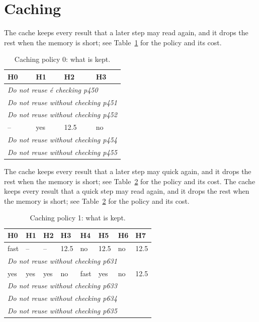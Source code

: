 \section{Caching}
The cache keeps every result that a later step may read again, and it drops the rest when the memory is short; see Table~\ref{tab:c0} for the policy and its cost. 

\begin{table}[t]
  \centering
  \caption{Caching policy 0: what is kept.}\label{tab:c0}
  \begin{tabular}{llll}
    \toprule
    \textbf{H0} & \textbf{H1} & \textbf{H2} & \textbf{H3} \\
    \midrule
    \multicolumn{4}{l}{\emph{Do not reuse é checking p450}} \\
    \multicolumn{4}{l}{\emph{Do not reuse without checking p451}} \\
    \multicolumn{4}{l}{\emph{Do not reuse without checking p452}} \\
    -- & yes & 12.5 & no \\
    \multicolumn{4}{l}{\emph{Do not reuse without checking p454}} \\
    \multicolumn{4}{l}{\emph{Do not reuse without checking p455}} \\
    \bottomrule
  \end{tabular}
\end{table}

The cache keeps every result that a later step may quick again, and it drops the rest when the memory is short; see Table~\ref{tab:c1} for the policy and its cost. The cache keeps every result that a quick step may read again, and it drops the rest when the memory is short; see Table~\ref{tab:c1} for the policy and its cost. 

\begin{table}[t]
  \centering
  \caption{Caching policy 1: what is kept.}\label{tab:c1}
  \begin{tabular}{llllllll}
    \toprule
    \textbf{H0} & \textbf{H1} & \textbf{H2} & \textbf{H3} & \textbf{H4} & \textbf{H5} & \textbf{H6} & \textbf{H7} \\
    \midrule
    fast & -- & -- & 12.5 & no & 12.5 & no & 12.5 \\
    \multicolumn{8}{l}{\emph{Do not reuse without checking p631}} \\
    yes & yes & yes & no & fast & yes & no & 12.5 \\
    \multicolumn{8}{l}{\emph{Do not reuse without checking p633}} \\
    \multicolumn{8}{l}{\emph{Do not reuse without checking p634}} \\
    \multicolumn{8}{l}{\emph{Do not reuse without checking p635}} \\
    \bottomrule
  \end{tabular}
\end{table}

